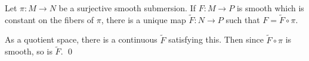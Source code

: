 \eproof

\bthrm

    Let $\pi\colon M\to N$ be a surjective smooth submersion.
    If $F\colon M\to P$ is smooth which is constant on the fibers of $\pi$, there is a unique map $\tilde F\colon N\to P$ such that
    $F=\tilde F\circ\pi$.

\ethrm

\bproof

    As a quotient space, there is a continuous $\tilde F$ satisfying this.
    Then since $\tilde F\circ\pi$ is smooth, so is $\tilde F$.
    \qed

\eproof

